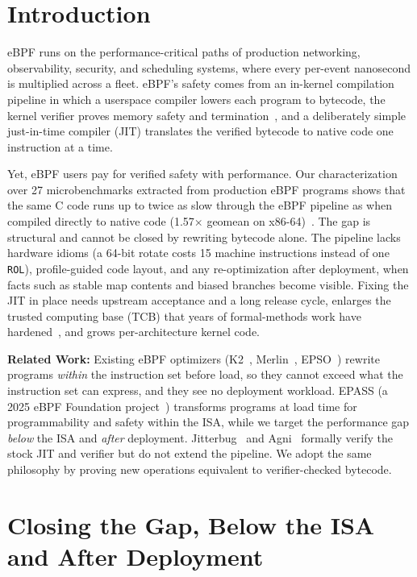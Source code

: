 \section{Introduction}

eBPF runs on the performance-critical paths of production networking, observability, security, and scheduling systems, where every per-event nanosecond is multiplied across a fleet.  eBPF's safety comes from an in-kernel compilation pipeline in which a userspace compiler lowers each program to bytecode, the kernel verifier proves memory safety and termination~\cite{gershuni2019simple}, and a deliberately simple just-in-time compiler (JIT) translates the verified bytecode to native code one instruction at a time.

Yet, eBPF users pay for verified safety with performance.  Our characterization over 27 microbenchmarks extracted from production eBPF programs shows that the same C code runs up to twice as slow through the eBPF pipeline as when compiled directly to native code (1.57$\times$ geomean on x86-64)~\cite{zheng2026kops}.  The gap is structural and cannot be closed by rewriting bytecode alone. The pipeline lacks hardware idioms (a 64-bit rotate costs 15 machine instructions instead of one \texttt{ROL}), profile-guided code layout, and any re-optimization after deployment, when facts such as stable map contents and biased branches become visible.  Fixing the JIT in place needs upstream acceptance and a long release cycle, enlarges the trusted computing base (TCB) that years of formal-methods work have hardened~\cite{nelson2020specification,vishwanathan2023verifying}, and grows per-architecture kernel code.

\noindent\textbf{Related Work:} Existing eBPF optimizers (K2~\cite{xu2021synthesizing}, Merlin~\cite{mao2024merlin}, EPSO~\cite{zhu2025epso}) rewrite programs \emph{within} the instruction set before load, so they cannot exceed what the instruction set can express, and they see no deployment workload.  EPASS (a 2025 eBPF Foundation project~\cite{huang2025epass}) transforms programs at load time for programmability and safety within the ISA, while we target the performance gap \emph{below} the ISA and \emph{after} deployment.  Jitterbug~\cite{nelson2020specification} and Agni~\cite{vishwanathan2023verifying} formally verify the stock JIT and verifier but do not extend the pipeline. We adopt the same philosophy by proving new operations equivalent to verifier-checked bytecode.
\section{Closing the Gap, Below the ISA and After Deployment}

